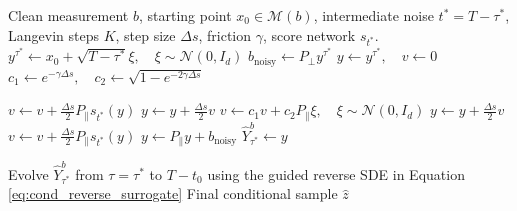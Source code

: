 \documentclass[twoside,11pt]{article}
\numberwithin{equation}{section}
\begin{document}
\begin{algorithm}
\caption{Conditional Sampling via Affine BAOAB Initialization}
\label{alg:baoab_sampling}
\begin{algorithmic}[1]
 Clean measurement $b$, starting point $x_0 \in \mathcal{M}(b)$, intermediate noise $t^* = T - \tau^*$, Langevin steps $K$, step size $\Delta s$, friction $\gamma$, score network $s_{t^*}$.
\STATE $y^{\tau^*} \leftarrow x_0 + \sqrt{T - \tau^*}\xi, \quad \xi \sim \mathcal{N}(0, I_d)$
\STATE $b_{\text{noisy}} \leftarrow P_{\perp} y^{\tau^*}$ 
\STATE $y \leftarrow y^{\tau^*}, \quad v \leftarrow 0$
\STATE $c_1 \leftarrow e^{-\gamma \Delta s}, \quad c_2 \leftarrow \sqrt{1 - e^{-2\gamma \Delta s}}$

    \STATE $v \leftarrow v + \frac{\Delta s}{2} P_{\parallel} s_{t^*}(y)$ \hfill {}
    \STATE $y \leftarrow y + \frac{\Delta s}{2} v$ \hfill {}
    \STATE $v \leftarrow c_1 v + c_2 P_{\parallel} \xi, \quad \xi \sim \mathcal{N}(0, I_d)$ \hfill {}
    \STATE $y \leftarrow y + \frac{\Delta s}{2} v$ \hfill {}
    \STATE $v \leftarrow v + \frac{\Delta s}{2} P_{\parallel} s_{t^*}(y)$ \hfill {}
    \STATE $y \leftarrow P_{\parallel} y + b_{\text{noisy}}$ \hfill {}
\ENDFOR
\STATE $\hat{Y}_{\tau^*}^b \leftarrow y$

\STATE Evolve $\hat{Y}_{\tau^*}^b$ from $\tau = \tau^*$ to $T-t_0$ using the guided reverse SDE in Equation \eqref{eq:cond_reverse_surrogate}
 Final conditional sample $\hat{z}$
\end{algorithmic}
\end{algorithm}
\end{document}
